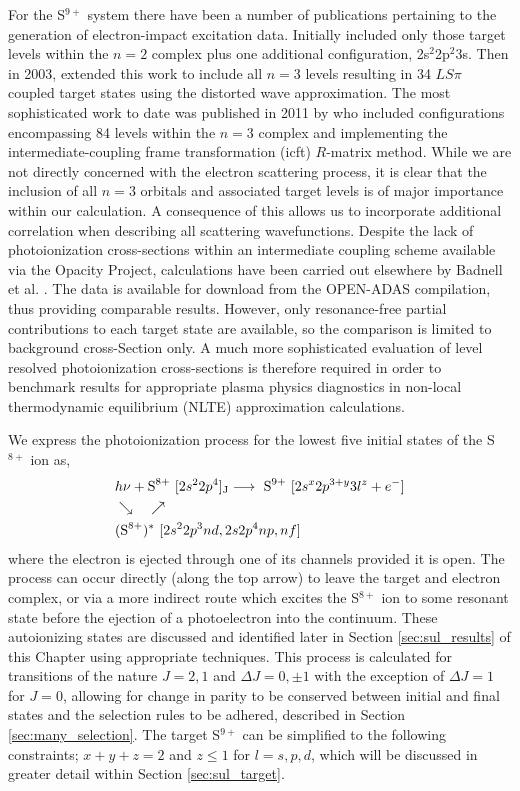 For the S$^{9+}$ system there have been a number of publications pertaining to the generation of electron-impact excitation data. Initially \citet{2000ADNDT..76..176B} included only those target levels within the $n = 2$ complex plus one additional configuration, 2s$^{2}$2p$^{2}$3s. Then in 2003, \citet{2003ADNDT..85..169B} extended this work to include all $n = 3$ levels resulting in 34 $LS\pi$ coupled target states using the distorted wave approximation. The most sophisticated work to date was published in 2011 by \citet{2011A&A...533A..87L} who included configurations encompassing 84 levels within the $n = 3$ complex and implementing the intermediate-coupling frame transformation ({\sc icft}) $R$-matrix method. While we are not directly concerned with the electron scattering process, it is clear that the inclusion of all $n = 3$ orbitals and associated target levels is of major importance within our calculation. A consequence of this allows us to incorporate additional correlation when describing all scattering wavefunctions. Despite the lack of photoionization cross-sections within an intermediate coupling scheme available via the Opacity Project, calculations have been carried out elsewhere by Badnell et al. \cite{2005MNRAS.360..458B}. The data is available for download from the OPEN-ADAS compilation, thus providing comparable results. However, only resonance-free partial contributions to each target state are available, so the comparison is limited to background cross-Section only. A much more sophisticated evaluation of level resolved photoionization cross-sections is therefore required in order to benchmark results for appropriate plasma physics diagnostics in non-local thermodynamic equilibrium (NLTE) approximation calculations.

We express the photoionization process for the lowest five initial states of the S$^{8+}$ ion as,
\begin{eqnarray}\label{eq:sul_process}
& h\nu + \text{S}^{8+}~  [2s^22p^4]_{\rm J}  \longrightarrow ~ \text{S}^{9+}~ [2s^x2p^{3+y}3l^z + e^-] \nonumber \\ 
&  \searrow ~~~~ \nearrow\\ \nonumber
& (\text{S}^{8+})^*~ [2s^22p^3nd, 2s2p^4np, nf]
\end{eqnarray} 
where the electron is ejected through one of its channels provided it is open. The process can occur directly (along the top arrow) to leave the target and electron complex, or via a more indirect route which excites the S$^{8+}$ ion to some resonant state before the ejection of a photoelectron into the continuum. These autoionizing states are discussed and identified later in Section \ref{sec:sul_results} of this Chapter using appropriate techniques. This process is calculated for transitions of the nature $J=2, 1$ and $\Delta J = 0, \pm 1$ with the exception of $\Delta J  = 1$ for $J = 0$, allowing for change in parity to be conserved between initial and final states and the selection rules to be adhered, described in Section \ref{sec:many_selection}. The target  S$^{9+}$ can be simplified to the following constraints; $x+y+z = 2$ and $z\leq 1$ for $l = s, p, d$, which will be discussed in greater detail within Section \ref{sec:sul_target}.

